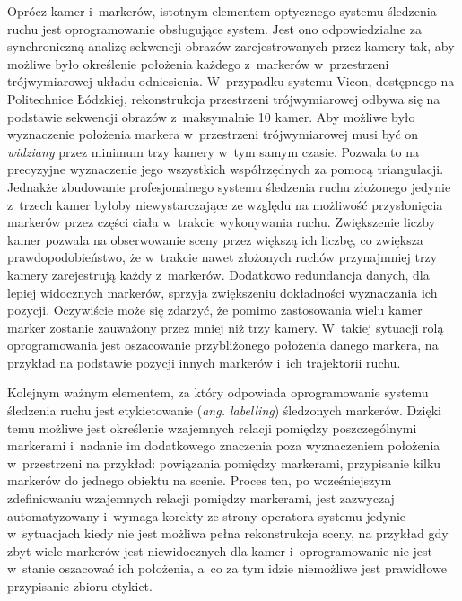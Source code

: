 Oprócz kamer i~markerów, istotnym elementem optycznego systemu śledzenia ruchu jest oprogramowanie obsługujące system. Jest ono odpowiedzialne za synchroniczną analizę sekwencji obrazów zarejestrowanych przez kamery tak, aby możliwe było określenie położenia każdego z~markerów w~przestrzeni trójwymiarowej układu odniesienia. W~przypadku systemu Vicon, dostępnego na Politechnice Łódzkiej, rekonstrukcja przestrzeni trójwymiarowej odbywa się na podstawie sekwencji obrazów z~maksymalnie 10 kamer. Aby możliwe było wyznaczenie położenia markera w~przestrzeni trójwymiarowej musi być on \textsl{widziany} przez minimum trzy kamery w~tym samym czasie. Pozwala to na precyzyjne wyznaczenie jego wszystkich współrzędnych za pomocą triangulacji. Jednakże zbudowanie profesjonalnego systemu śledzenia ruchu złożonego jedynie z~trzech kamer byłoby niewystarczające ze względu na możliwość przysłonięcia markerów przez części ciała w~trakcie wykonywania ruchu. Zwiększenie liczby kamer pozwala na obserwowanie sceny przez większą ich liczbę, co zwiększa prawdopodobieństwo, że w~trakcie nawet złożonych ruchów przynajmniej trzy kamery zarejestrują każdy z~markerów. Dodatkowo redundancja danych, dla lepiej widocznych markerów, sprzyja zwiększeniu dokładności wyznaczania ich pozycji. Oczywiście może się zdarzyć, że pomimo zastosowania wielu kamer marker zostanie zauważony przez mniej niż trzy kamery. W~takiej sytuacji rolą oprogramowania jest oszacowanie przybliżonego położenia danego markera, na przykład na podstawie pozycji innych markerów i~ich trajektorii ruchu.
			
Kolejnym ważnym elementem, za który odpowiada oprogramowanie systemu śledzenia ruchu jest etykietowanie (\emph{ang. labelling}) śledzonych markerów. Dzięki temu możliwe jest określenie wzajemnych relacji pomiędzy poszczególnymi markerami i~nadanie im dodatkowego znaczenia poza wyznaczeniem położenia w~przestrzeni na przykład: powiązania pomiędzy markerami, przypisanie kilku markerów do jednego obiektu na scenie. Proces ten, po wcześniejszym zdefiniowaniu wzajemnych relacji pomiędzy markerami, jest zazwyczaj automatyzowany i~wymaga korekty ze strony operatora systemu jedynie w~sytuacjach kiedy nie jest możliwa pełna rekonstrukcja sceny, na przykład gdy zbyt wiele markerów jest niewidocznych dla kamer i~oprogramowanie nie jest w~stanie oszacować ich położenia, a~co za tym idzie niemożliwe jest prawidłowe przypisanie zbioru etykiet.

